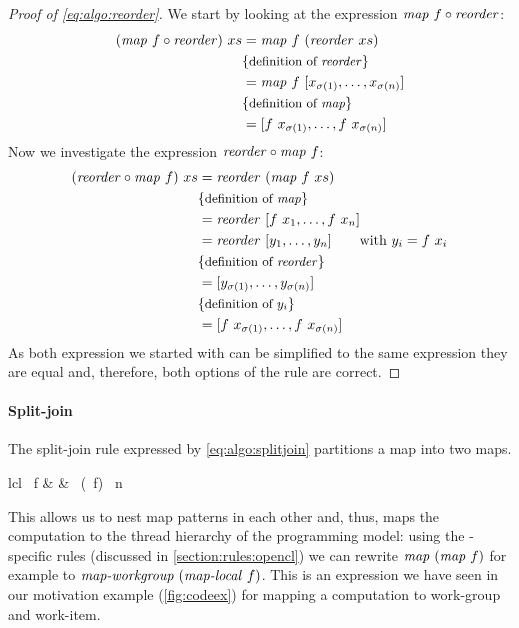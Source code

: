 \begin{proof}[Proof of \autoref{eq:algo:reorder}]
  We start by looking at the expression $\text{\textit{map}}\ f \circ \text{\textit{reorder}}$:
  \begin{align*}
    (\text{\textit{map}}\ f \circ \text{\textit{reorder}})\ xs
      &= \text{\textit{map}}\ f\ (\text{\textit{reorder}}\ xs)\\
      & \{\text{\small definition of \text{\textit{reorder}}}\}\\
      &= \text{\textit{map}}\ f\ [x_{\sigma(1)}, \ldots, x_{\sigma(n)}]\\
      & \{\text{\small definition of \text{\textit{map}}}\}\\
      &= [f\ x_{\sigma(1)}, \ldots, f\ x_{\sigma(n)}]
  \end{align*}
  Now we investigate the expression $\text{\textit{reorder}} \circ \text{\textit{map}}\ f$:
  \begin{align*}
    (\reorder \circ \map\ f)\ xs
      &= \reorder\ (\map\ f\ xs)\\
      & \comment{definition of \map}\\
      &= \reorder\ [f\ x_1, \ldots, f\ x_n]\\
      &= \reorder\ [y_1, \ldots, y_n]\qquad \text{with } y_i = f\ x_i\\
      & \comment{definition of \reorder}\\
      &= [y_{\sigma(1)}, \dots, y_{\sigma(n)}]\\
      & \comment{definition of $y_i$}\\
      &= [f\ x_{\sigma(1)}, \ldots, f\ x_{\sigma(n)}]
  \end{align*}
  As both expression we started with can be simplified to the same expression they are equal and, therefore, both options of the rule are correct.
\end{proof}

\paragraph{Split-join}
The split-join rule expressed by \autoref{eq:algo:splitjoin} partitions a map into two maps.
%
\begin{rerule}{lcl}
  \map\ f
    & \rightarrow &
      \join \circ \map\ (\map\ f) \circ \splitN\ n
  \label{eq:algo:splitjoin}
\end{rerule}
%
This allows us to nest map patterns in each other and, thus, maps the computation to the thread hierarchy of the \OpenCL programming model:
using the \OpenCL-specific rules (discussed in \autoref{section:rules:opencl}) we can rewrite $\text{\textit{map}}\ (\text{\textit{map}}\ f)$ for example to $\text{\textit{map-workgroup}}\ (\text{\textit{map-local}}\ f)$.
This is an expression we have seen in our motivation example (\autoref{fig:codeex}) for mapping a computation to \OpenCL work-group and work-item.

